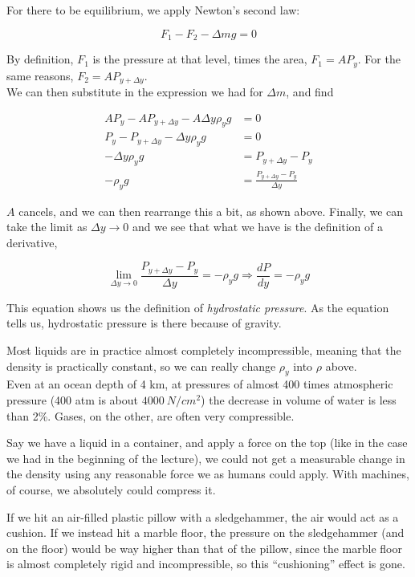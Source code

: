 For there to be equilibrium, we apply Newton's second law:

\begin{equation}
F_1 - F_2 - \Delta m g = 0
\end{equation}

By definition, $F_1$ is the pressure at that level, times the area, $F_1 = A P_y$. For the same reasons, $F_2 = A P_{y + \Delta y}$.\\
We can then substitute in the expression we had for $\Delta m$, and find

\begin{align}
A P_y - A P_{y + \Delta y} - A \Delta y \rho_y g &= 0\\
P_y - P_{y + \Delta y} - \Delta y \rho_y g &= 0\\
- \Delta y \rho_y g &= P_{y + \Delta y} - P_y\\
- \rho_y g &= \frac{P_{y + \Delta y} - P_y}{\Delta y}
\end{align}

$A$ cancels, and we can then rearrange this a bit, as shown above. Finally, we can take the limit as $\Delta y \to 0$ and we see that what we have is the definition of a derivative,

\begin{equation}
\lim_{\Delta y \to 0} \frac{P_{y + \Delta y} - P_y}{\Delta y} = - \rho_y g \Rightarrow \frac{dP}{dy} = -\rho_y g
\end{equation}

This equation shows us the definition of \emph{hydrostatic pressure}. As the equation tells us, hydrostatic pressure is there because of gravity.

Most liquids are in practice almost completely incompressible, meaning that the density is practically constant, so we can really change $\rho_y$ into $\rho$ above.\\
Even at an ocean depth of 4 km, at pressures of almost 400 times atmospheric pressure (400 atm is about $\SI{4000}{N/cm^2}$) the decrease in volume of water is less than 2\%. Gases, on the other, are often very compressible.

Say we have a liquid in a container, and apply a force on the top (like in the case we had in the beginning of the lecture), we could not get a measurable change in the density using any reasonable force we as humans could apply. With machines, of course, we absolutely could compress it.

If we hit an air-filled plastic pillow with a sledgehammer, the air would act as a cushion. If we instead hit a marble floor, the pressure on the sledgehammer (and on the floor) would be way higher than that of the pillow, since the marble floor is almost completely rigid and incompressible, so this ``cushioning'' effect is gone.

